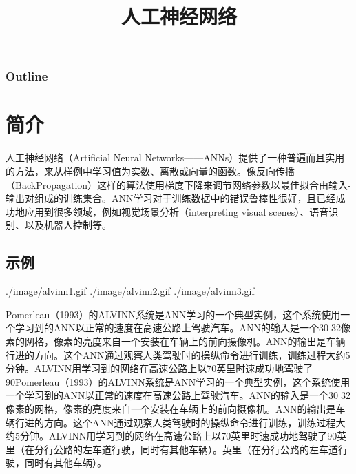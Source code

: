 \documentclass{article}
\title{人工神经网络}
\author{}
\date{}
\begin{document}
\maketitle

\begin{frame}
\frametitle{Outline}
\setcounter{tocdepth}{3}
\tableofcontents
\end{frame}










\section{简介}
\label{sec-1}




人工神经网络（Artificial Neural Networks——ANNs）提供了一种普遍而且实用的方法，来从样例中学习值为实数、离散或向量的函数。像反向传播（BackPropagation）这样的算法使用梯度下降来调节网络参数以最佳拟合由输入-输出对组成的训练集合。ANN学习对于训练数据中的错误鲁棒性很好，且已经成功地应用到很多领域，例如视觉场景分析（interpreting visual scenes）、语音识别、以及机器人控制等。
\subsection{示例}
\label{sec-1-1}


\href{file:///run/media/xing/000751B6000C49A9/github/learning/machinelearning/beamer/4/image/alvinn1.gif}{./image/alvinn1.gif}
\href{file:///run/media/xing/000751B6000C49A9/github/learning/machinelearning/beamer/4/image/alvinn2.gif}{./image/alvinn2.gif}
\href{file:///run/media/xing/000751B6000C49A9/github/learning/machinelearning/beamer/4/image/alvinn3.gif}{./image/alvinn3.gif}

Pomerleau（1993）的ALVINN系统是ANN学习的一个典型实例，这个系统使用一个学习到的ANN以正常的速度在高速公路上驾驶汽车。ANN的输入是一个3032像素的网格，像素的亮度来自一个安装在车辆上的前向摄像机。ANN的输出是车辆行进的方向。这个ANN通过观察人类驾驶时的操纵命令进行训练，训练过程大约5分钟。ALVINN用学习到的网络在高速公路上以70英里时速成功地驾驶了90Pomerleau（1993）的ALVINN系统是ANN学习的一个典型实例，这个系统使用一个学习到的ANN以正常的速度在高速公路上驾驶汽车。ANN的输入是一个3032像素的网格，像素的亮度来自一个安装在车辆上的前向摄像机。ANN的输出是车辆行进的方向。这个ANN通过观察人类驾驶时的操纵命令进行训练，训练过程大约5分钟。ALVINN用学习到的网络在高速公路上以70英里时速成功地驾驶了90英里（在分行公路的左车道行驶，同时有其他车辆）。英里（在分行公路的左车道行驶，同时有其他车辆）。
\end{document}
